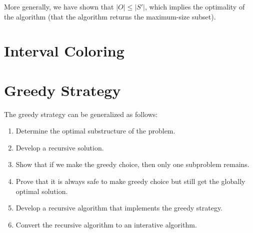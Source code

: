 More generally, we have shown that $|O| \leq |S'|$, which implies the optimality of the algorithm (that the algorithm returns the maximum-size subset).

\section{Interval Coloring}

\section{Greedy Strategy}

The greedy strategy can be generalized as follows:

\begin{enumerate}
    \item Determine the optimal substructure of the problem.
    \item Develop a recursive solution.
    \item Show that if we make the greedy choice, then only one subproblem remains.
    \item Prove that it is always safe to make greedy choice but still get the globally optimal solution.
    \item Develop a recursive algorithm that implements the greedy strategy.
    \item Convert the recursive algorithm to an interative algorithm.
\end{enumerate}